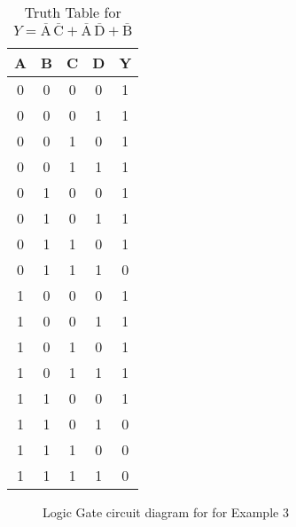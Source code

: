 \documentclass{scrartcl}
\begin{document}
\begin{table}[H]
    \centering
    \caption{Truth Table for \( Y = \mathrm{\overline{A}\,\overline{C} + \overline{A}\,\overline{D} + \overline{B}} \)}
    \vspace{0.2cm}
    \begin{tabular}{|c|c|c|c||c|}
    \hline
    \textbf{A} & \textbf{B} & \textbf{C} & \textbf{D} & \textbf{Y} \\
    \hline
    0 & 0 & 0 & 0 & 1 \\
    0 & 0 & 0 & 1 & 1 \\
    0 & 0 & 1 & 0 & 1 \\
    0 & 0 & 1 & 1 & 1 \\
    0 & 1 & 0 & 0 & 1 \\
    0 & 1 & 0 & 1 & 1 \\
    0 & 1 & 1 & 0 & 1 \\
    0 & 1 & 1 & 1 & 0 \\
    1 & 0 & 0 & 0 & 1 \\
    1 & 0 & 0 & 1 & 1 \\
    1 & 0 & 1 & 0 & 1 \\
    1 & 0 & 1 & 1 & 1 \\
    1 & 1 & 0 & 0 & 1 \\
    1 & 1 & 0 & 1 & 0 \\
    1 & 1 & 1 & 0 & 0 \\
    1 & 1 & 1 & 1 & 0 \\
    \hline
    \end{tabular}
    \end{table}
\begin{figure}[H]
    \centering
    
    \caption{Logic Gate circuit diagram for for Example 3}
\end{figure}
\end{document}
